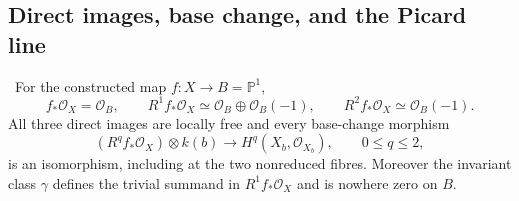 \subsection{Direct images, base change, and the Picard line}

\begin{theorem}
\label{thm:structure-direct-images-audit}
\Verified\ For the constructed map \(f:X\to B=\mathbb P^1\),
\[
 f_*\mathcal O_X=\mathcal O_B,\qquad
 R^1f_*\mathcal O_X\simeq
 \mathcal O_B\oplus\mathcal O_B(-1),\qquad
 R^2f_*\mathcal O_X\simeq\mathcal O_B(-1).
\tag{9.12}
\]
All three direct images are locally free and every base-change morphism
\[
 (R^qf_*\mathcal O_X)\otimes k(b)
 \longrightarrow H^q(X_b,\mathcal O_{X_b}),
 \qquad 0\le q\le2,
\tag{9.13}
\]
is an isomorphism, including at the two nonreduced fibres.  Moreover the
invariant class \(\gamma\) defines the trivial summand in
\(R^1f_*\mathcal O_X\) and is nowhere zero on \(B\).
\end{theorem}

